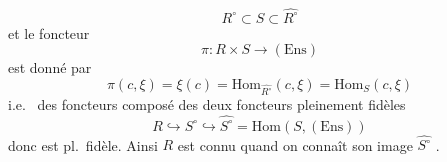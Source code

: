 \documentclass[11pt,a4paper]{article}
\begin{document}
\begin{equation}
  R^{\circ} \subset S \subset \widehat{R^{\circ}}
  \tag{8.2.15}
\end{equation}
\struck{\ill{}} et le foncteur
\[
  \pi : R \times S \longrightarrow (\mathrm{Ens})
\]
est donné par
\begin{equation}
  \pi(c, \xi) = \xi(c) =
  \mathrm{Hom}_{\widehat{R^{\circ}}}(c, \xi) = \mathrm{Hom}_{S}(c, \xi)
  \tag{8.2.16}
\end{equation}
i.e.\ \struck{\ill{}}   des foncteurs   
composé des deux foncteurs pleinement fidèles
\begin{equation}
  R \hookrightarrow S^{\circ}
  \hookrightarrow \widehat{S^{\circ}} =
  \mathrm{Hom}(S, (\mathrm{Ens}))
  \tag{8.2.17}
\end{equation}
donc est pl.\ fidèle. Ainsi $R$ est connu  quand on
connaît son image  $\widehat{S^{\circ}}$ \ill{}
\struck{\ill{}}.
\end{document}
